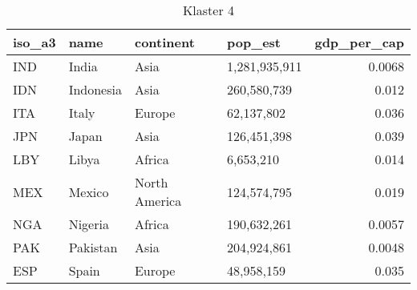 \begin{table}
    \centering
    \caption{Klaster 4}
    \label{tab:cl4}
    \begin{tabular}{llllr}
        \toprule
        iso\_a3 & name      & continent     & pop\_est      & gdp\_per\_cap \\
        \midrule
        IND     & India     & Asia          & 1,281,935,911 & 0.0068        \\
        IDN     & Indonesia & Asia          & 260,580,739   & 0.012         \\
        ITA     & Italy     & Europe        & 62,137,802    & 0.036         \\
        JPN     & Japan     & Asia          & 126,451,398   & 0.039         \\
        LBY     & Libya     & Africa        & 6,653,210     & 0.014         \\
        MEX     & Mexico    & North America & 124,574,795   & 0.019         \\
        NGA     & Nigeria   & Africa        & 190,632,261   & 0.0057        \\
        PAK     & Pakistan  & Asia          & 204,924,861   & 0.0048        \\
        ESP     & Spain     & Europe        & 48,958,159    & 0.035         \\
        \bottomrule
    \end{tabular}
\end{table}
